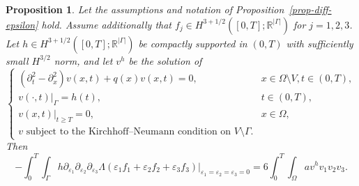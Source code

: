 \documentclass[11pt]{amsart}
\theoremstyle{definition}
\theoremstyle{plain}
\newtheorem{proposition}[definition]{Proposition}
\numberwithin{equation}{section}
\begin{document}
\begin{proposition}\label{prop-linearization-identity}
Let the assumptions and notation of Proposition~\ref{prop-diff-epsilon} hold. 
Assume additionally that $f_j \in H^{3+1/2}([0,T]; \mathbb{R}^{|\Gamma|})$ for $j=1,2,3$.
Let $h\in H^{3 + 1/2}([0,T]; \mathbb{R}^{|\Gamma|})$ be compactly supported in $(0,T)$ with sufficiently small $H^{3/2}$ norm, and let $v^h$ be the solution of 
\begin{equation*}
    \begin{cases}
    (\partial_{t}^2 -\partial_x^2 ) v(x,t)+q(x) v(x,t)=0, &x\in \Omega\setminus V, t \in (0,T),\\
    v(\cdot,t)|_{\Gamma}=h(t), & t\in (0,T),\\
    v(x,t)|_{t \geq T}=0, & x\in \Omega, \\
    v \textrm{ subject to the Kirchhoff--Neumann condition on } V\setminus\Gamma.
    \end{cases}
\end{equation*}
Then 
\begin{equation}\label{eq-linearization-identity}
    - \int_0^T \int_{\Gamma} h \partial_{\varepsilon_1} \partial_{\varepsilon_2}\partial_{\varepsilon_3}\Lambda(\varepsilon_1f_1 + \varepsilon_2f_2 + \varepsilon_3f_3)\big|_{\varepsilon_1=\varepsilon_2=\varepsilon_3 = 0} = 6\int_0^T\int_\Omega a v^h v_1 v_2 v_3.
\end{equation}
\end{proposition}
\end{document}
